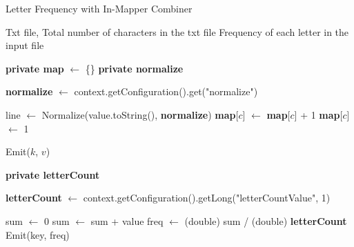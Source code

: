     \begin{algorithm}[H]
    \caption{Letter Frequency with In-Mapper Combiner}
    \begin{algorithmic}[1]
    \Require Txt file, Total number of characters in the txt file
    \Ensure Frequency of each letter in the input file
    
    \Statex
        \State \textbf{private map} $\leftarrow$ \{\}
        \State \textbf{private normalize}
    
            \State \textbf{normalize} $\leftarrow$ context.getConfiguration().get("normalize")
        \EndProcedure
    
            \State line $\leftarrow$ Normalize(value.toString(), \textbf{normalize})
                        \State \textbf{map}[$c$] $\leftarrow$ \textbf{map}[$c$] + 1
                    \Else
                        \State \textbf{map}[$c$] $\leftarrow$ 1
                    \EndIf
                \EndIf
            \EndFor
        \EndProcedure
    
                \State Emit($k$, $v$)
            \EndFor
        \EndProcedure
    \EndClass
    
    \Statex
        \State \textbf{private letterCount}
    
            \State \textbf{letterCount} $\leftarrow$ context.getConfiguration().getLong("letterCountValue", 1)
        \EndProcedure
    
            \State sum $\leftarrow$ 0
                \State sum $\leftarrow$ sum + value
            \EndFor
            \State freq $\leftarrow$ (double) sum / (double) \textbf{letterCount}
            \State Emit(key, freq)
        \EndProcedure
    \EndClass
    \end{algorithmic}
    \end{algorithm}
    